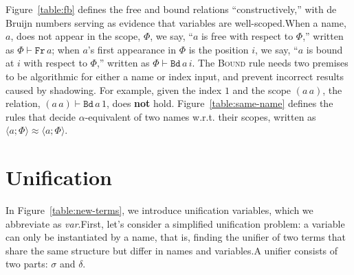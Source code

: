 \documentclass[a4paper,UKenglish]{lipics-v2016}
\newcommand{\clos}[2] {
\langle #1; #2 \rangle
}
\newcommand{\aeq}[4] {
\clos{#1}{#2} \approx \clos{#3}{#4}
}
\newcommand*{\transname}[1]{\textsc{#1}}
\begin{document}
Figure~\ref{table:fb} defines the free and bound relations
``constructively,'' with de Bruijn numbers serving as
evidence that variables are well-scoped.When a name, $a$, does not
appear in the scope, $\Phi$, we say, ``$a$ is free with respect to
$\Phi$,'' written as $\Phi \vdash \texttt{Fr}\, a$; when $a$'s first
appearance in $\Phi$ is the position $i$, we say, ``$a$ is bound at
$i$ with respect to $\Phi$,'' written as $\Phi \vdash \texttt{Bd}\,
a\,i$. The \transname{Bound} rule needs two premises to be algorithmic
for either a name or index input,
and prevent incorrect results caused by shadowing.
For example, given the index $1$ and the scope $(a\,a)$,
the relation, $(a\,a) \vdash \texttt{Bd}\,a\,1$, does \textbf{not} hold.
Figure~\ref{table:same-name} defines the rules that decide
$\alpha$-equivalent of two names w.r.t. their scopes, written as
$\aeq{a}{\Phi}{a}{\Phi}$. 

\section{Unification}
\label{unify}
In Figure~\ref{table:new-terms}, we introduce unification variables,
which we abbreviate as \emph{var}.First, let's consider a simplified unification
problem: a variable can only be instantiated by a name, that is,
finding the unifier of two terms that share the same structure but
differ in names and variables.A unifier consists of two parts:
$\sigma$ and $\delta$.
\end{document}
